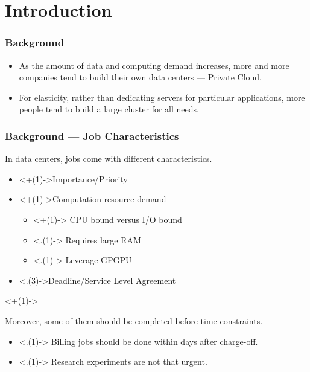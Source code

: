\section{Introduction}

\begin{frame}
  \frametitle{Background}
  \begin{itemize}[<+->]
    \item As the amount of data and computing demand increases, more and
      more companies tend to build their own data centers --- Private
      Cloud.
    \item For elasticity, rather than dedicating servers for particular
      applications, more people tend to build a large cluster for all
      needs.
  \end{itemize}
\end{frame}
\begin{frame}
  \frametitle{Background --- Job Characteristics}
  In data centers, jobs come with different characteristics.
  \begin{itemize}[<+->]
    \item <+(1)->Importance/Priority
    \item <+(1)->Computation resource demand
      \begin{itemize}
        \item <+(1)-> CPU bound versus I/O bound
        \item <.(1)-> Requires large RAM
        \item <.(1)-> Leverage GPGPU
      \end{itemize}
    \item <.(3)->{\alert{Deadline/Service Level Agreement}}
  \end{itemize}
  \onslide<+(1)->{Moreover, some of them should be completed before time
    constraints.
    \begin{itemize}
      \item <.(1)-> Billing jobs should be done within days after
        charge-off.
      \item <.(1)-> Research experiments are not that urgent.
    \end{itemize}
  }
\end{frame}
